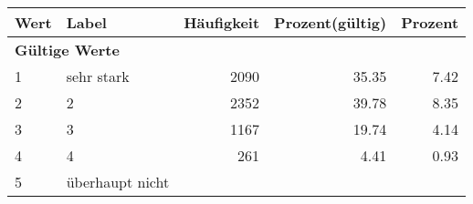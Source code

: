      \begin{longtable}{lXrrr}
     \toprule
     \textbf{Wert} & \textbf{Label} & \textbf{Häufigkeit} & \textbf{Prozent(gültig)} & \textbf{Prozent} \\
     \endhead
     \midrule
     \multicolumn{5}{l}{\textbf{Gültige Werte}}\\

     1 &
     \multicolumn{1}{X}{ sehr stark   } &


       \num{2090} &
       \num[round-mode=places,round-precision=2]{35.35} &
         \num[round-mode=places,round-precision=2]{7.42} \\

     2 &
     \multicolumn{1}{X}{ 2   } &


       \num{2352} &
       \num[round-mode=places,round-precision=2]{39.78} &
         \num[round-mode=places,round-precision=2]{8.35} \\

     3 &
     \multicolumn{1}{X}{ 3   } &


       \num{1167} &
       \num[round-mode=places,round-precision=2]{19.74} &
         \num[round-mode=places,round-precision=2]{4.14} \\

     4 &
     \multicolumn{1}{X}{ 4   } &


       \num{261} &
       \num[round-mode=places,round-precision=2]{4.41} &
         \num[round-mode=places,round-precision=2]{0.93} \\

     5 &
     \multicolumn{1}{X}{ überhaupt nicht   } &



\end{longtable}
